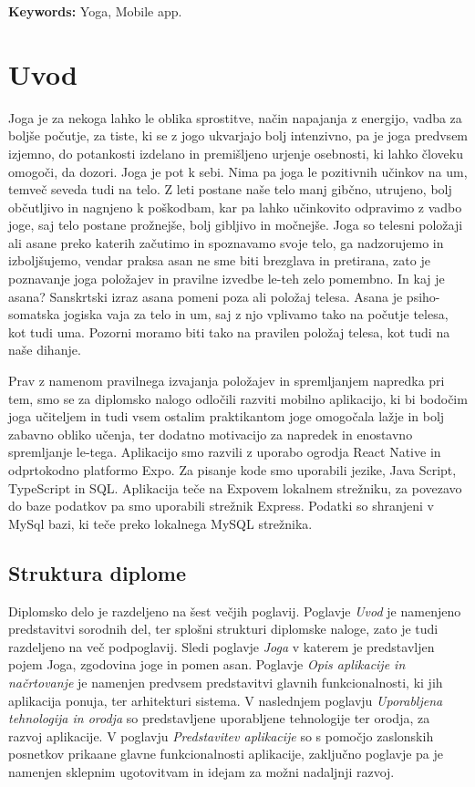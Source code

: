 \documentclass[a4paper, 12pt]{book}
\newcommand{\tkeywordsEn}{Yoga, Mobile app}
\newcommand{\clearemptydoublepage}{\newpage{\pagestyle{empty}\cleardoublepage}}
\begin{document}
\noindent\textbf{Keywords:} \tkeywordsEn.
\clearemptydoublepage

\mainmatter
\setcounter{page}{1}
\pagestyle{fancy}

\chapter{Uvod}
Joga je za nekoga lahko le oblika sprostitve, način napajanja z energijo, vadba za boljše počutje, za tiste, ki se z jogo ukvarjajo bolj intenzivno, pa je joga predvsem izjemno, do potankosti izdelano in premišljeno urjenje osebnosti, ki lahko človeku omogoči, da dozori. Joga je pot k sebi. Nima pa joga le pozitivnih učinkov na um, temveč seveda tudi na telo. 
Z leti postane naše telo manj gibčno, utrujeno, bolj občutljivo in nagnjeno k poškodbam, kar pa lahko učinkovito odpravimo z vadbo joge, saj telo postane prožnejše, bolj gibljivo in močnejše. Joga so telesni položaji ali asane preko katerih začutimo in spoznavamo svoje telo, ga nadzorujemo in izboljšujemo, vendar praksa asan ne sme biti brezglava in pretirana, zato je poznavanje joga položajev in pravilne izvedbe le-teh zelo pomembno. 
In kaj je asana? Sanskrtski izraz asana pomeni poza ali položaj telesa. Asana je psiho-somatska jogiska vaja za telo in um, saj z njo vplivamo tako na počutje telesa, kot tudi uma. Pozorni moramo biti tako na pravilen položaj telesa, kot tudi na naše dihanje. 

Prav z namenom pravilnega izvajanja položajev in spremljanjem napredka pri tem, smo se za diplomsko nalogo odločili razviti mobilno aplikacijo, ki bi bodočim joga učiteljem in tudi vsem ostalim praktikantom joge omogočala lažje in bolj zabavno obliko učenja, ter dodatno motivacijo za napredek in enostavno spremljanje le-tega. Aplikacijo smo razvili z uporabo ogrodja React Native in odprtokodno platformo Expo. Za pisanje kode smo uporabili jezike, Java Script, TypeScript in SQL. Aplikacija teče na Expovem lokalnem strežniku, za povezavo do baze podatkov pa smo uporabili strežnik Express. Podatki so shranjeni v MySql bazi, ki teče preko lokalnega MySQL strežnika.

\section{Struktura diplome}
Diplomsko delo je razdeljeno na šest večjih poglavij. Poglavje \textit{Uvod} je namenjeno predstavitvi sorodnih del, ter splošni strukturi diplomske naloge, zato je tudi razdeljeno na več podpoglavij. Sledi poglavje \textit{Joga} v katerem je predstavljen pojem Joga, zgodovina joge in pomen asan. Poglavje \textit{Opis aplikacije in načrtovanje} je namenjen predvsem predstavitvi glavnih funkcionalnosti, ki jih aplikacija ponuja, ter arhitekturi sistema. V naslednjem poglavju \textit{Uporabljena tehnologija in orodja} so predstavljene uporabljene tehnologije ter orodja, za razvoj aplikacije. V poglavju \textit{Predstavitev aplikacije} so s pomočjo zaslonskih posnetkov prikaane glavne funkcionalnosti aplikacije, zaključno poglavje pa je namenjen sklepnim ugotovitvam in idejam za možni nadaljnji razvoj.
\end{document}
